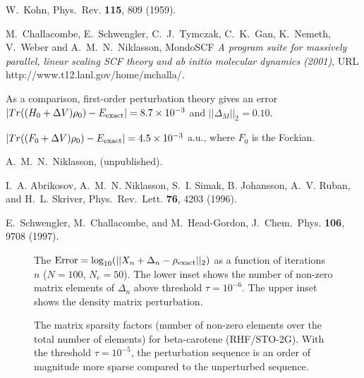 \begin{references}
 W.\ Kohn,
Phys.\ Rev. {\bf 115}, 809 (1959).

 M.\ Challacombe, E.\ Schwengler, C.\ J.\ Tymczak,
C.\ K.\ Gan, K.\ Nemeth, V.\ Weber and A.\ M.\ N.\ Niklasson, {\sc MondoSCF}
{\it A program suite for massively parallel, linear scaling SCF theory and
ab initio molecular dynamics (2001)}, URL http://www.t12.lanl.gov/home/mchalla/.

 As a comparison, first-order perturbation theory 
gives an error $|Tr((H_0+\Delta V)\rho_0)-E_{\rm exact}| = 8.7 \times 10^{-3}$ and
$||\Delta_M ||_2 = 0.10$.

 $|Tr((F_0+\Delta V)\rho_0)-E_{\rm exact}| = 4.5 \times 10^{-3}$ a.u.,
where $F_0$ is the Fockian.

 A.\ M.\ N.\ Niklasson, (unpublished).

 I.\ A. Abrikosov, A.\ M.\ N. Niklasson, S.\ I. Simak,
B. Johansson, A.\ V. Ruban, and H.\ L. Skriver,
Phys.\ Rev.\ Lett. {\bf 76}, 4203 (1996).


 E.\ Schwengler, M.\ Challacombe, and M.\ Head-Gordon,
J.\ Chem.\ Phys. {\bf 106}, 9708 (1997).

\end{references}

\begin{figure}
\caption{\small  The 
${\rm Error} = \log_{10}(||X_n + \Delta_n - \rho_{\rm exact}||_2)$
as a function of iterations $n$ ($N = 100$, $N_e = 50$). The lower 
inset shows the number of non-zero matrix elements of $\Delta_n$ 
above threshold $\tau = 10^{-6}$.  The upper inset shows the density matrix
perturbation.
\label{DX}}
\end{figure}

\begin{figure}
\caption{\small  The matrix sparsity factors (number of non-zero elements 
over the total number of elements) for beta-carotene (RHF/STO-2G). With the 
threshold $\tau = 10^{-5}$, the perturbation sequence is an order
of magnitude more sparse compared to the unperturbed sequence.
\label{BetaC}}
\end{figure}


